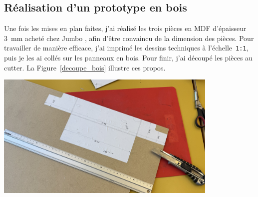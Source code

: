 \begin{minipage}{\textwidth}
    \subsection{Réalisation d'un prototype en bois} \label{prototype_bois}
    Une fois les mises en plan faites, j'ai réalisé les trois pièces en MDF d'épaisseur 3~mm acheté chez Jumbo \cite{mdfJumbo}, afin d'être convaincu de la dimension des pièces. Pour travailler de manière efficace, j'ai imprimé les dessins techniques à l'échelle~\texttt{1:1}, puis je les ai collés sur les panneaux en bois. Pour finir, j'ai découpé les pièces au cutter. La Figure~\ref{decoupe_bois} illustre ces propos.
    \vspace{1em}
    \begin{center}
        \includegraphics[width=0.8\textwidth]{assets/figures/Protections_laser/Securite_mecanique/Protection_entree_laser/decoupe_bois.jpeg}
    \end{center}
    \label{decoupe_bois}
\end{minipage}

